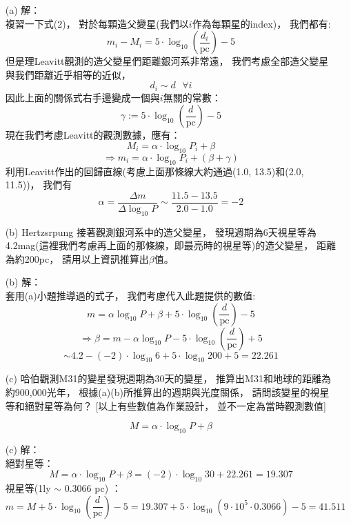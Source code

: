 \documentclass{article}
\newcommand{\sfa}{\text{  } \forall}
\theoremstyle{definition}
\begin{document}
\begin{enumerate}
\begin{enumerate}
			\item[(a)] 解：\\
				複習一下式(2)，
				對於每顆造父變星(我們以$i$作為每顆星的index)，
				我們都有:
				\[
					m_{i} - M_{i} = 5 \cdot \log_{10} \left(\frac{d_{i}}{\text{pc}} \right) - 5
				\]
				但是理Leavitt觀測的造父變星們距離銀河系非常遠，
				我們考慮全部造父變星與我們距離近乎相等的近似，
				\[
					d_{i} \sim d \sfa i
				\]
				因此上面的關係式右手邊變成一個與$i$無關的常數：
				\[
					\gamma := 5 \cdot \log_{10} \left(\frac{d}{\text{pc}} \right) - 5
				\]
				現在我們考慮Leavitt的觀測數據，應有：
				\[
					M_i = \alpha \cdot \log_{10} P_i + \beta
				\]
				\[
					\Rightarrow m_i = \alpha \cdot \log_{10} P_i + (\beta + \gamma)
				\]
				利用Leavitt作出的回歸直線(考慮上面那條線大約通過(1.0, 13.5)和(2.0, 11.5))，
				我們有
				\[
					\alpha = \frac{\Delta m}{\Delta \log_{10}P} \sim \frac{11.5 - 13.5}{2.0 - 1.0} = -2
				\]

			\item[(b)] Hertzsrpung 接著觀測銀河系中的造父變星，
				發現週期為6天視星等為4.2mag(這裡我們考慮再上面的那條線，即最亮時的視星等)的造父變星，
				距離為約200pc，
				請用以上資訊推算出$\beta$值。

			\item[(b)] 解：\\
				套用(a)小題推導過的式子，
				我們考慮代入此題提供的數值:
				\[
					m = \alpha \log_{10} P + \beta + 5 \cdot \log_{10} \left( \frac{d}{\text{pc}} \right) - 5
				\]
				\[
					\Rightarrow \beta = m - \alpha \log_{10} P - 5 \cdot \log_{10} \left( \frac{d}{\text{pc}} \right) + 5 
				\]
				\[
					\sim 4.2 - (-2) \cdot \log_{10} 6 + 5 \cdot \log_{10} 200 + 5 = 22.261
				\]

			\item[(c)] 哈伯觀測M31的變星發現週期為30天的變星，
				推算出M31和地球的距離為約900,000光年，
				根據(a)(b)所推算出的週期與光度關係，
				請問該變星的視星等和絕對星等為何？
				[以上有些數值為作業設計，
				並不一定為當時觀測數值]

				\[
					M = \alpha \cdot \log_{10} P + \beta
				\]

			\item[(c)] 解：\\
				絕對星等：
				\[
					M = \alpha \cdot \log_{10} P + \beta = (-2) \cdot \log_{10} 30 + 22.261 = 19.307
				\]
				視星等(1ly $\sim$ 0.3066 pc) ：
				\[
					m = M + 5 \cdot \log_{10} \left( \frac{d}{\text{pc}} \right) - 5 = 19.307 + 5 \cdot \log_{10} \left(9 \cdot 10^5 \cdot 0.3066 \right) - 5 = 41.511
				\]
		\end{enumerate}


\end{enumerate}
\end{document}
